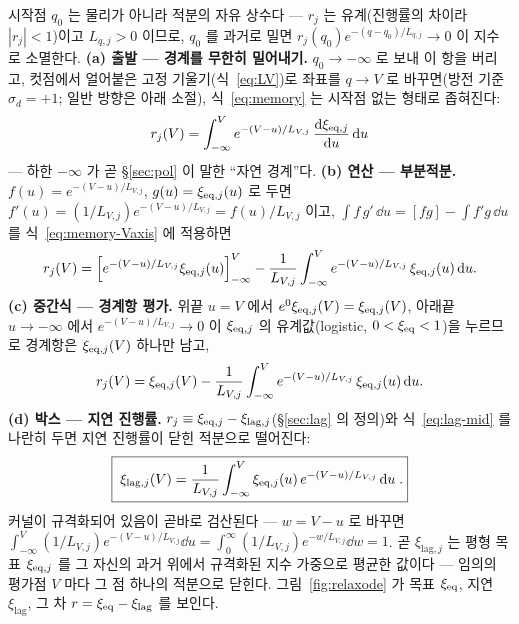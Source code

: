 시작점 $q_0$ 는 물리가 아니라 적분의 자유 상수다 --- $r_j$ 는 유계(진행률의 차이라 $|r_j|<1$)이고
$L_{q,j}>0$ 이므로, $q_0$ 를 과거로 밀면 $r_j(q_0)e^{-(q-q_0)/L_{q,j}}\to0$ 이 지수로 소멸한다.
\textbf{(a) 출발 --- 경계를 무한히 밀어내기.} $q_0\to-\infty$ 로 보내 이 항을 버리고, 컷점에서 얼어붙은
고정 기울기(식~\eqref{eq:LV})로 좌표를 $q\to V$ 로 바꾸면(방전 기준 $\sigma_d=+1$; 일반 방향은
아래 소절), 식~\eqref{eq:memory} 는 시작점 없는 형태로 좁혀진다:
\begin{equation}
r_j(V)=\int_{-\infty}^{V} e^{-(V-u)/L_{V,j}}\,\frac{\mathrm{d}\xi_{\mathrm{eq},j}}{\mathrm{d} u}\,\mathrm{d} u
\label{eq:memory-Vaxis}
\end{equation}
--- 하한 $-\infty$ 가 곧 \S\ref{sec:pol} 이 말한 ``자연 경계''다. \textbf{(b) 연산 --- 부분적분.}
$f(u)=e^{-(V-u)/L_{V,j}}$, $g(u)=\xi_{\mathrm{eq},j}(u)$ 로 두면 $f'(u)=(1/L_{V,j})e^{-(V-u)/L_{V,j}}=f(u)/L_{V,j}$
이고, $\int f\,g'\,\dd u=[fg]-\int f'g\,\dd u$ 를 식~\eqref{eq:memory-Vaxis} 에 적용하면
\begin{equation}
r_j(V)=\Big[e^{-(V-u)/L_{V,j}}\xi_{\mathrm{eq},j}(u)\Big]_{-\infty}^{V}
-\frac{1}{L_{V,j}}\int_{-\infty}^{V} e^{-(V-u)/L_{V,j}}\,\xi_{\mathrm{eq},j}(u)\,\mathrm{d} u.
\label{eq:lag-byparts}
\end{equation}
\textbf{(c) 중간식 --- 경계항 평가.} 위끝 $u=V$ 에서 $e^{0}\xi_{\mathrm{eq},j}(V)=\xi_{\mathrm{eq},j}(V)$, 아래끝
$u\to-\infty$ 에서 $e^{-(V-u)/L_{V,j}}\to0$ 이 $\xi_{\mathrm{eq},j}$ 의 유계값(logistic, $0<\xi_{\mathrm{eq}}<1$)을
누르므로 경계항은 $\xi_{\mathrm{eq},j}(V)$ 하나만 남고,
\begin{equation}
r_j(V)=\xi_{\mathrm{eq},j}(V)-\frac{1}{L_{V,j}}\int_{-\infty}^{V} e^{-(V-u)/L_{V,j}}\,\xi_{\mathrm{eq},j}(u)\,\mathrm{d} u.
\label{eq:lag-mid}
\end{equation}
\textbf{(d) 박스 --- 지연 진행률.} $r_j\equiv\xi_{\mathrm{eq},j}-\xi_{\mathrm{lag},j}$(\S\ref{sec:lag} 의 정의)와
식~\eqref{eq:lag-mid} 를 나란히 두면 지연 진행률이 닫힌 적분으로 떨어진다:
\begin{equation}
\boxed{\;\xi_{\mathrm{lag},j}(V)=\frac{1}{L_{V,j}}\int_{-\infty}^{V} \xi_{\mathrm{eq},j}(u)\,e^{-(V-u)/L_{V,j}}\,\mathrm{d} u\;.}
\label{eq:lag}
\end{equation}
커널이 규격화되어 있음이 곧바로 검산된다 --- $w=V-u$ 로 바꾸면
$\int_{-\infty}^{V}(1/L_{V,j})e^{-(V-u)/L_{V,j}}\dd u=\int_0^\infty (1/L_{V,j})e^{-w/L_{V,j}}\dd w=1$.
곧 $\xi_{\mathrm{lag},j}$ 는 평형 목표 $\xi_{\mathrm{eq},j}$ 를 그 자신의 과거 위에서 규격화된 지수 가중으로
평균한 값이다 --- 임의의 평가점 $V$ 마다 그 점 하나의 적분으로 닫힌다.
그림~\ref{fig:relaxode} 가 목표 $\xi_{\mathrm{eq}}$, 지연 $\xi_\mathrm{lag}$, 그 차 $r=\xi_{\mathrm{eq}}-\xi_\mathrm{lag}$ 를
보인다.


